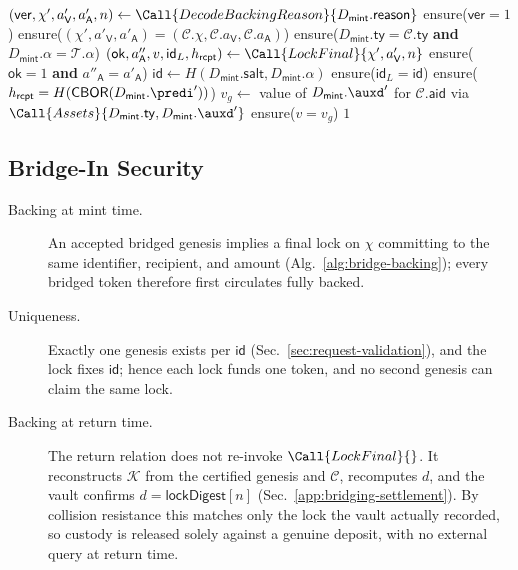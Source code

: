 \begin{algorithm}[!htbp]
\caption{Backing Mint-Reason Verification}\label{alg:bridge-backing}
\begin{algorithmic}[0]
  \State $(\mathsf{ver},\chi',a'_\mathsf{V},a'_\mathsf{A},n) \gets \Call{DecodeBackingReason}{D_\mathsf{mint}.\mathsf{reason}}$
  \State ensure($\mathsf{ver} = 1$)
  \State ensure($(\chi',a'_\mathsf{V},a'_\mathsf{A}) = (\mathcal{C}.\chi,\mathcal{C}.a_\mathsf{V},\mathcal{C}.a_\mathsf{A})$) 
  \State ensure($D_\mathsf{mint}.\mathsf{ty} = \mathcal{C}.\mathsf{ty}$ \textbf{and} $D_\mathsf{mint}.\alpha = \mathcal{T}.\alpha$)
  \State $(\mathsf{ok},a''_\mathsf{A},v,\mathsf{id}_L,h_\mathsf{rcpt}) \gets \Call{LockFinal}{\chi',a'_\mathsf{V},n}$ 
  \State ensure($\mathsf{ok} = 1$ \textbf{and} $a''_\mathsf{A} = a'_\mathsf{A}$)
  \State $\mathsf{id} \gets H(D_\mathsf{mint}.\mathsf{salt},D_\mathsf{mint}.\alpha)$
  \State ensure($\mathsf{id}_L = \mathsf{id}$) 
  \State ensure($h_\mathsf{rcpt} = H(\mathsf{CBOR}(D_\mathsf{mint}.\predi'))$) 
  \State $v_g \gets$ value of $D_\mathsf{mint}.\auxd'$ for $\mathcal{C}.\mathsf{aid}$ via $\Call{Assets}{D_\mathsf{mint}.\mathsf{ty},D_\mathsf{mint}.\auxd'}$
  \State ensure($v = v_g$) 
  \State \Return $1$
\EndFunction
\end{algorithmic}
\end{algorithm}

\subsection{Bridge-In Security}\label{app:bridging-in-security}

\begin{description}
\item[Backing at mint time.] An accepted bridged genesis implies a final lock on $\chi$ committing to the same identifier, recipient, and amount (Alg.~\ref{alg:bridge-backing}); every bridged token therefore first circulates fully backed.
\item[Uniqueness.] Exactly one genesis exists per $\mathsf{id}$ (Sec.~\ref{sec:request-validation}), and the lock fixes $\mathsf{id}$; hence each lock funds one token, and no second genesis can claim the same lock.
\item[Backing at return time.] The return relation does not re-invoke $\Call{LockFinal}{}$. It reconstructs $\mathcal{K}$ from the certified genesis and $\mathcal{C}$, recomputes $d$, and the vault confirms $d = \mathsf{lockDigest}[n]$ (Sec.~\ref{app:bridging-settlement}). By collision resistance this matches only the lock the vault actually recorded, so custody is released solely against a genuine deposit, with no external query at return time.
\end{description}

